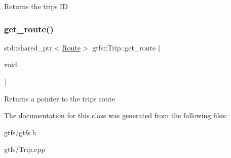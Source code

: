\begin{DoxyReturn}{Returns}
the trip\textquotesingle{}s ID 
\end{DoxyReturn}
\mbox{\label{classgtfs_1_1Trip_a2b6cc135946d7e7db7bb35951987e35c}} 
\subsubsection{\texorpdfstring{get\+\_\+route()}{get\_route()}}
{\footnotesize\ttfamily std\+::shared\+\_\+ptr$<$\hyperlink{classgtfs_1_1Route}{Route}$>$ gtfs\+::\+Trip\+::get\+\_\+route (\begin{DoxyParamCaption}\item[{void}]{ }\end{DoxyParamCaption})\hspace{0.3cm}{\ttfamily [inline]}}

\begin{DoxyReturn}{Returns}
a pointer to the trip\textquotesingle{}s route 
\end{DoxyReturn}


The documentation for this class was generated from the following files\+:\begin{DoxyCompactItemize}
\item 
gtfs/gtfs.\+h\item 
gtfs/Trip.\+cpp\end{DoxyCompactItemize}
